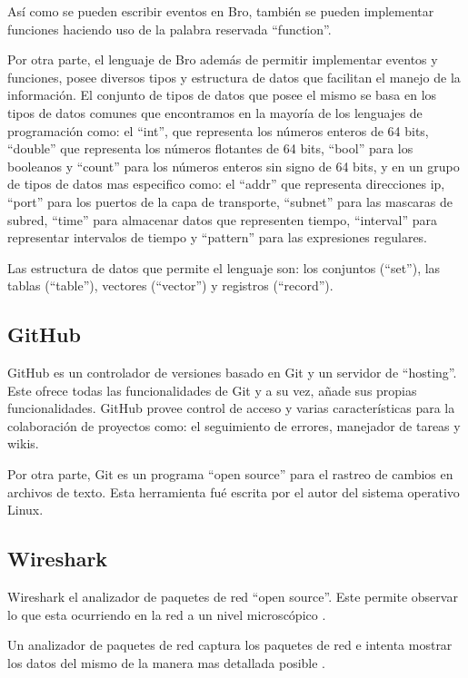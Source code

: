 Así como se pueden escribir eventos en Bro, también se pueden implementar funciones haciendo uso de la palabra reservada ``function''.

Por otra parte, el lenguaje de Bro además de permitir implementar eventos y funciones, posee diversos tipos y estructura de datos que facilitan el manejo de la información. 
El conjunto de tipos de datos que posee el mismo se basa en los tipos de datos comunes que encontramos en la mayoría de los lenguajes de programación como: el ``int'', que representa los números enteros de 64 bits, ``double'' que representa los números flotantes de 64 bits, ``bool'' para los booleanos y ``count''  para los números enteros sin signo de 64 bits, y en un grupo de tipos de datos  mas especifico como: el ``addr'' que representa direcciones ip, ``port'' para los puertos de la capa de transporte, ``subnet'' para las mascaras de subred, ``time'' para almacenar datos que representen tiempo, ``interval'' para representar intervalos de tiempo y ``pattern'' para las expresiones regulares.

Las estructura de datos que permite el lenguaje son: los conjuntos (``set''), las tablas (``table''), vectores (``vector'') y registros (``record'').

\subsection{GitHub}


GitHub es un controlador de versiones basado en Git y un servidor de ``hosting''. Este ofrece todas las funcionalidades de Git y a su vez, añade sus propias funcionalidades. GitHub provee control de acceso y varias características para la colaboración de proyectos como: el seguimiento de errores, manejador de tareas y wikis. \cite{GitHub}

Por otra parte, Git es un programa ``open source'' para el rastreo de cambios en archivos de texto. Esta herramienta fué escrita por el autor del sistema operativo Linux. \cite{Git}

\subsection{Wireshark}

Wireshark el analizador de paquetes de red ``open source''. Este permite  observar lo que esta ocurriendo en la red a un nivel microscópico \cite{wireshark1}.

Un analizador de paquetes de red captura los paquetes de red e intenta mostrar los datos del mismo de la manera mas detallada posible \cite{wireshark2}.

